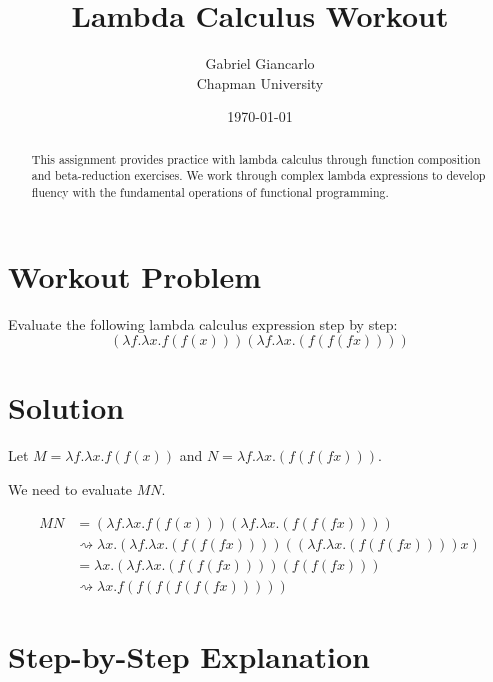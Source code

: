 \documentclass{article}
\title{Lambda Calculus Workout}
\author{Gabriel Giancarlo \\ Chapman University}
\date{\today}
\theoremstyle{plain}
\theoremstyle{definition}
\theoremstyle{remark}
\begin{document}
\maketitle

\begin{abstract}
This assignment provides practice with lambda calculus through function composition and beta-reduction exercises. We work through complex lambda expressions to develop fluency with the fundamental operations of functional programming.
\end{abstract}

\section{Workout Problem}

Evaluate the following lambda calculus expression step by step:
$$(\lambda f.\lambda x.f(f(x))) (\lambda f.\lambda x.(f(f(f x))))$$

\section{Solution}

Let $M = \lambda f.\lambda x.f(f(x))$ and $N = \lambda f.\lambda x.(f(f(f x)))$.

We need to evaluate $M N$.

\begin{align}
M N &= (\lambda f.\lambda x.f(f(x))) (\lambda f.\lambda x.(f(f(f x)))) \\
&\rightsquigarrow \lambda x. (\lambda f.\lambda x.(f(f(f x)))) ((\lambda f.\lambda x.(f(f(f x)))) x) \\
&= \lambda x. (\lambda f.\lambda x.(f(f(f x)))) (f(f(f x))) \\
&\rightsquigarrow \lambda x. f(f(f(f(f(f x)))))
\end{align}

\section{Step-by-Step Explanation}
\end{document}
